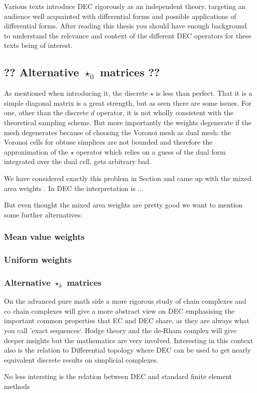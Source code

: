 Various texts introduce DEC rigorously as an independent theory, targeting an audience well acquainted with differential forms and possible applications of differential forms. After reading this thesis you should have enough background to understand the relevance and context of the different DEC operators for these texts being of interest. 

\subsection{?? Alternative $\star_0$ matrices ??}
As mentioned when introducing it, the discrete $\star$ is less than perfect. That it is a simple diagonal matrix is a great strength, but as seen there are some issues. For one, other than the discrete $d$ operator, it is not wholly consistent with the theoretical sampling scheme. But more importantly the weights degenerate if the mesh degenerates because of choosing the Voronoi mesh as dual mesh: the Voronoi cells for obtuse simplices are not bounded and therefore the approximation of the $\star$ operator which relies on a guess of the dual form integrated over the dual cell, gets arbitrary bad.

We have considered exactly this problem in Section  and came up with the mixed area weights . In DEC the interpretation is ...

But even thought the mixed area weights are pretty good we want to mention some further alternatives:

\subsubsection{Mean value weights}

\subsubsection{Uniform weights}

\subsubsection{Alternative $\star_k$ matrices}

On the advanced pure math side a more rigorous study of chain complexes and co chain complexes will give a more abstract view on DEC emphasising the important common properties that EC and DEC share, as they are always what you call 'exact sequences`. 
Hodge theory and the de-Rham complex will give deeper insights but the mathematics are very involved. 
Interesting in this context also is the relation to Differential topology where DEC can be used  to get nearly equivalent discrete results on simplicial complexes.

No less intersting is the relation between DEC and standard finite element methods 